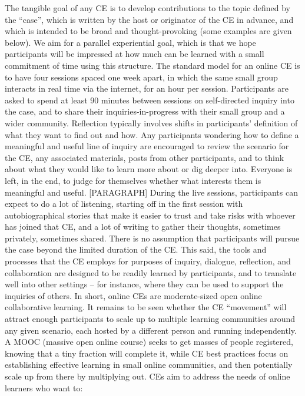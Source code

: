 The tangible goal of any CE is to develop contributions to the topic
defined by the ``case'', which is written by the host or originator of
the CE in advance, and which is intended to be broad and
thought-provoking (some examples are given below). We aim for a parallel
experiential goal, which is that we hope participants will be impressed
at how much can be learned with a small commitment of time using this
structure. The standard model for an online CE is to have four sessions
spaced one week apart, in which the same small group interacts in real
time via the internet, for an hour per session. Participants are asked
to spend at least 90 minutes between sessions on self-directed inquiry
into the case, and to share their inquiries-in-progress with their small
group and a wider community. Reflection typically involves shifts in
participants' definition of what they want to find out and how. Any
participants wondering how to define a meaningful and useful line of
inquiry are encouraged to review the scenario for the CE, any associated
materials, posts from other participants, and to think about what they
would like to learn more about or dig deeper into. Everyone is left, in
the end, to judge for themselves whether what interests them is
meaningful and useful. {[}PARAGRAPH{]} During the live sessions,
participants can expect to do a lot of listening, starting off in the
first session with autobiographical stories that make it easier to trust
and take risks with whoever has joined that CE, and a lot of writing to
gather their thoughts, sometimes privately, sometimes shared. There is
no assumption that participants will pursue the case beyond the limited
duration of the CE. This said, the tools and processes that the CE
employs for purposes of inquiry, dialogue, reflection, and collaboration
are designed to be readily learned by participants, and to translate
well into other settings -- for instance, where they can be used to
support the inquiries of others. In short, online CEs are moderate-sized
open online collaborative learning. It remains to be seen whether the CE
``movement'' will attract enough participants to scale up to multiple
learning communities around any given scenario, each hosted by a
different person and running independently. A MOOC (massive open online
course) seeks to get masses of people registered, knowing that a tiny
fraction will complete it, while CE best practices focus on establishing
effective learning in small online communities, and then potentially
scale up from there by multiplying out. CEs aim to address the needs of
online learners who want to:

